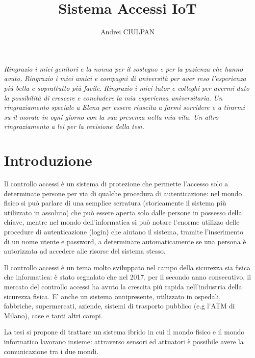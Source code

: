 \documentclass[12pt]{report}
\newcommand\blankpage{%
	\null
	\thispagestyle{empty}%
	\addtocounter{page}{-1}%
	\newpage}
\begin{document}
\title{Sistema Accessi IoT}
\author{Andrei CIULPAN}
\afterpage{\blankpage}
% 
%
\beforepreface

{\hfill \footnotesize {\sl Ringrazio i miei genitori e la nonna per il sostegno e per la pazienza che hanno avuto.}}
\vskip 0.8cm
{\hfill \footnotesize {\sl Ringrazio i miei amici e compagni di università per aver reso l'esperienza più bella e soprattutto più facile.}}
\vskip 0.8cm
{\hfill \footnotesize {\sl Ringrazio i miei tutor e colleghi per avermi dato la possibilità di crescere e concludere la mia esperienza universitaria.}}
\vskip 0.8cm
{\hfill \footnotesize {\sl Un ringraziamento speciale a Elena per essere riuscita a farmi sorridere e a tirarmi su il morale in ogni giorno con la sua presenza nella mia vita.  Un altro ringraziamento a lei per la revisione della tesi.}}
       

\afterpreface

\chapter{Introduzione}\label{cap:introduzione}
%

Il controllo accessi è un sistema di protezione che permette l'accesso solo a determinate persone per via di qualche procedura di autenticazione: nel mondo fisico si può parlare di una semplice serratura (storicamente il sistema più utilizzato in assoluto) che può essere aperta solo dalle persone in possesso della chiave, mentre nel mondo dell'informatica si può notare l'enorme utilizzo delle procedure di autenticazione (login) che aiutano il sistema, tramite l'inserimento di un nome utente e password, a determinare automaticamente se una persona è autorizzata ad accedere alle risorse del sistema stesso.

Il controllo accessi\cite{controllo_accessi} è un tema molto sviluppato nel campo della sicurezza sia fisica che informatica: è stato segnalato che nel 2017, per il secondo anno consecutivo, il mercato del controllo accessi ha avuto la crescita più rapida nell'industria della sicurezza fisica\cite{crescita_controllo_accessi}. E' anche un sistema onnipresente, utilizzato in ospedali, fabbriche, supermercati, aziende, sistemi di trasporto pubblico (e.g l'ATM di Milano), case e tanti altri campi.  

La tesi si propone di trattare un sistema ibrido in cui il mondo fisico e il mondo informatico lavorano insieme: attraverso sensori ed attuatori è possibile avere la comunicazione tra i due mondi. 
\end{document}
